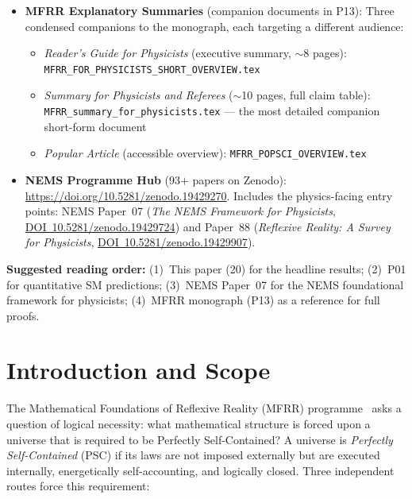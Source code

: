\documentclass[11pt]{article}
\theoremstyle{plain}
\theoremstyle{definition}
\theoremstyle{remark}
\begin{document}
\begin{tcolorbox}[colback=yellow!5!white,colframe=orange!60!black,
  title={\textbf{How to use this paper and the documents it surveys}},
  fonttitle=\bfseries,left=6pt,right=6pt,top=5pt,bottom=5pt,breakable]
\begin{itemize}[leftmargin=1.5em,itemsep=0.35em]
  \item \textbf{MFRR Explanatory Summaries} (companion documents in P13):
    Three condensed companions to the monograph, each targeting a different audience:
    \begin{itemize}[leftmargin=1.5em,itemsep=0.2em]
      \item \emph{Reader's Guide for Physicists} (executive summary, $\sim$8 pages):
        \texttt{MFRR\_FOR\_PHYSICISTS\_SHORT\_OVERVIEW.tex}
      \item \emph{Summary for Physicists and Referees} ($\sim$10 pages, full claim table):
        \texttt{MFRR\_summary\_for\_physicists.tex} --- the most detailed companion short-form document
      \item \emph{Popular Article} (accessible overview):
        \texttt{MFRR\_POPSCI\_OVERVIEW.tex}
    \end{itemize}

  \item \textbf{NEMS Programme Hub} (93$+$ papers on Zenodo):
    \url{https://doi.org/10.5281/zenodo.19429270}.\;
    Includes the physics-facing entry points: NEMS Paper~07
    (\emph{The NEMS Framework for Physicists},
    \href{https://doi.org/10.5281/zenodo.19429724}{DOI~10.5281/zenodo.19429724})
    and Paper~88
    (\emph{Reflexive Reality: A Survey for Physicists},
    \href{https://doi.org/10.5281/zenodo.19429907}{DOI~10.5281/zenodo.19429907}).
\end{itemize}

\medskip
\textbf{Suggested reading order:}
(1)~This paper (20) for the headline results;
(2)~P01 for quantitative SM predictions;
(3)~NEMS Paper~07 for the NEMS foundational framework for physicists;
(4)~MFRR monograph (P13) as a reference for full proofs.
\end{tcolorbox}

\section{Introduction and Scope}
\label{sec:intro}

The Mathematical Foundations of Reflexive Reality (MFRR) programme~\cite{SpivackMFRR}
asks a question of logical necessity: what mathematical structure is forced upon a universe
that is required to be Perfectly Self-Contained?
A universe is \emph{Perfectly Self-Contained} (PSC) if its laws are not imposed externally
but are executed internally, energetically self-accounting, and logically closed.
Three independent routes force this requirement:
\end{document}
